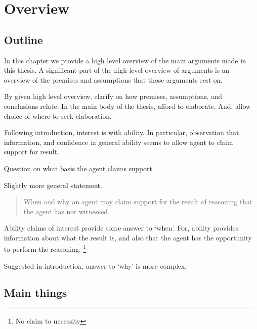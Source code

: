 \chapter{Overview}
\label{cha:overview}

\section{Outline}
\label{sec:outline}

\begin{note}
  In this chapter we provide a high level overview of the main arguments made in this thesis.
  A significant part of the high level overview of arguments is an overview of the premises and assumptions that those arguments rest on.

  By given high level overview, clarify on how premises, assumptions, and conclusions relate.
  In the main body of the thesis, afford to elaborate.
  And, allow choice of where to seek elaboration.
\end{note}

\begin{note}
  Following introduction, interest is with ability.
  In particular, observation that \gsi{} information, and confidence in general ability seems to allow agent to claim support for result.

  Question on what basis the agent claims support.

  Slightly more general statement.
  \begin{quote}
    When and why an agent may claim support for the result of reasoning that the agent has not witnessed.
  \end{quote}
  Ability claims of interest provide some answer to `when'.
  For, ability provides information about what the result is, and also that the agent has the opportunity to perform the reasoning.\nolinebreak
  \footnote{No claim to necessity}

  Suggested in introduction, answer to `why' is more complex.
\end{note}

\section{Main things}
\label{sec:main-things}

